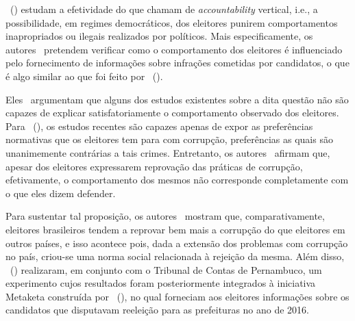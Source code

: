 \documentclass[
	12pt,				%
	openright,			%
	twoside,			%
	a4paper,			%
	openany,
	english,			%
	brazil				%
	]{abntex2}
\begin{document}



~(\citeyear{Boas2019Apr}) estudam a efetividade do que chamam de \textit{accountability} vertical, i.e., a possibilidade, em regimes democráticos, dos eleitores punirem comportamentos inapropriados ou ilegais realizados por políticos. Mais especificamente, os autores~\cite{Boas2019Apr} pretendem verificar como o comportamento dos eleitores é influenciado pelo fornecimento de informações sobre infrações cometidas por candidatos, o que é algo similar ao que foi feito por ~(\citeyear{ferraz2008exposing}). 

Eles~\cite{Boas2019Apr} argumentam que alguns dos estudos existentes sobre a dita questão não são capazes de explicar satisfatoriamente o comportamento observado dos eleitores. Para ~(\citeyear{Boas2019Apr}), os estudos recentes são capazes apenas de expor as preferências normativas que os eleitores tem para com corrupção, preferências as quais são unanimemente contrárias a tais crimes. Entretanto, os autores~\cite{Boas2019Apr} afirmam que, apesar dos eleitores expressarem reprovação das práticas de corrupção, efetivamente, o comportamento dos mesmos não corresponde completamente com o que eles dizem defender.

Para sustentar tal proposição, os autores~\cite{Boas2019Apr} mostram que, comparativamente, eleitores brasileiros tendem a reprovar bem mais a corrupção do que eleitores em outros países, e isso acontece pois, dada a extensão dos problemas com corrupção no país, criou-se uma norma social relacionada à rejeição da mesma. Além disso, ~(\citeyear{Boas2019Apr}) realizaram, em conjunto com o Tribunal de Contas de Pernambuco, um experimento cujos resultados foram posteriormente integrados à iniciativa Metaketa construída por ~(\citeyear{dunning2019voter}), no qual forneciam aos eleitores informações sobre os candidatos que disputavam reeleição para as prefeituras no ano de 2016.
\end{document}
